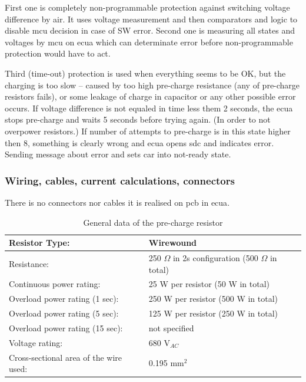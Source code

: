 First one is completely non-programmable protection against switching voltage difference by \gls{air}. It uses voltage measurement and then comparators and logic to disable \gls{mcu} decision in case of SW error.
Second one is measuring all states and voltages by \gls{mcu} on \gls{ecua} which can determinate error before non-programmable protection would have to act.

Third (time-out) protection is used when everything seems to be OK, but the charging is too slow – caused by too high pre-charge resistance (any of pre-charge resistors fails), or some leakage of charge in capacitor or any other possible error occurs. If voltage difference is not equaled in time less them 2 seconds, the \gls{ecua} stops pre-charge and waits 5 seconds before trying again. (In order to not overpower resistors.) If number of attempts to pre-charge is in this state higher then 8, something is clearly wrong and \gls{ecua} opens \gls{sdc} and indicates error. Sending message about error and sets car into not-ready state.

\subsubsection{Wiring, cables, current calculations, connectors}

There is no connectors nor cables it is realised on \gls{pcb} in \gls{ecua}. 


\begin{table}[H]
	\centering
	\caption{General data of the pre-charge resistor}
	\begin{tabu}{|X|X|}
		\hline
		Resistor Type: & Wirewound \\
		\hline

		Resistance: & 250 $\Omega$ in 2s configuration (500 $\Omega$ in total) \\
		\hline
		Continuous power rating: & 25 W per resistor (50 W  in total)\\
		\hline
		Overload power rating (1 sec): & 250 W per resistor (500 W in total) \\
		\hline
		Overload power rating (5 sec): & 125 W per resistor (250 W in total) \\
		\hline
		Overload power rating (15 sec): & not specified \\
		\hline
		Voltage rating: & 680 V$_{AC}$\\
		\hline
		Cross-sectional area of the wire used: & 0.195 mm$^2$\\
		\hline
	\end{tabu}%
	\label{tab:precharge-general}%
\end{table}%


